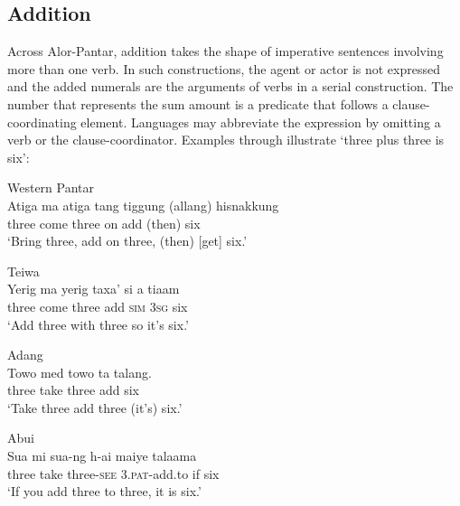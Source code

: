 \subsection{Addition}
\label{sec:8:Addition}
Across Alor-Pantar, addition takes the shape of imperative sentences involving more than one verb. In such constructions, the agent or actor is not expressed and the added numerals are the arguments of verbs in a serial construction. The number that represents the sum amount is a predicate that follows a clause-coordinating element. Languages may abbreviate the expression by omitting a verb or the clause-coordinator. Examples  through  illustrate `three plus three is six':


\ea%
\label{bkm:Ref342663714}
{\upshape Western Pantar}\\
 
\gll Atiga  ma{\footnotemark}  atiga  tang  tiggung  (allang)  hisnakkung\\  
   three   come  three  on  add  (then)  six \\
\glt  `Bring three, add on three, (then) [get] six.'
\z
{}


\ea
\label{ex:8:1237}
 
{\upshape Teiwa}\\
 \gll Yerig  ma  yerig  taxa'   si  a  tiaam\\
   three  come  three  add  \textsc{sim  3sg } six \\
 \glt`Add three with three so it's six.'
\z


 

  


\ea
\label{ex:8:1238}
{\upshape Adang}\\ 
 \gll Towo  med  towo  ta  talang.\\
    three   take   three   add   six\\
 \glt `Take three add three (it's) six.'
\z

\ea
\label{ex:8:1239}
{\upshape Abui}\\
 \gll Sua  mi  sua-ng  h-ai  maiye  talaama\\
  three  take  three-\textsc{see}  \textsc{3.pat}{}-add.to  if  six \\
 \glt  `If you add three to three, it is six.'  
\z





